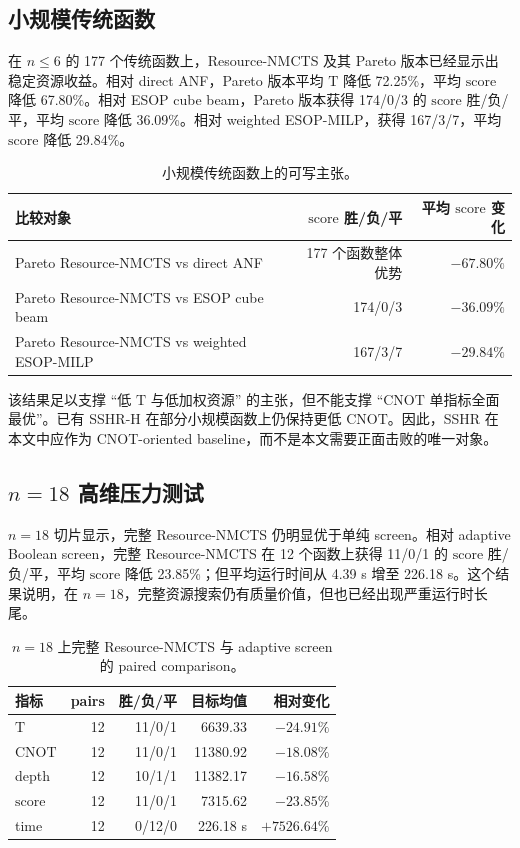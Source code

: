 \documentclass[UTF8,fontset=macnew,11pt]{ctexart}
\newcommand{\method}{Resource-NMCTS}
\newcommand{\score}{\ensuremath{\mathrm{score}}}
\newcommand{\cnot}{\ensuremath{\mathrm{CNOT}}}
\newcommand{\tcount}{\ensuremath{\mathrm{T}}}
\begin{document}
\subsection{小规模传统函数}

在 $n\leq6$ 的 177 个传统函数上，\method{} 及其 Pareto 版本已经显示出稳定资源收益。相对 direct ANF，Pareto 版本平均 \tcount{} 降低 72.25\%，平均 \score{} 降低 67.80\%。相对 ESOP cube beam，Pareto 版本获得 174/0/3 的 \score{} 胜/负/平，平均 \score{} 降低 36.09\%。相对 weighted ESOP-MILP，获得 167/3/7，平均 \score{} 降低 29.84\%。

\begin{table}[t]
\centering
\small
\caption{小规模传统函数上的可写主张。}
\label{tab:small_claims}
\begin{tabularx}{\linewidth}{>{\raggedright\arraybackslash}Xrr}
\toprule
比较对象 & \score{} 胜/负/平 & 平均 \score{} 变化 \\
\midrule
Pareto \method{} vs direct ANF & 177 个函数整体优势 & $-67.80\%$ \\
Pareto \method{} vs ESOP cube beam & 174/0/3 & $-36.09\%$ \\
Pareto \method{} vs weighted ESOP-MILP & 167/3/7 & $-29.84\%$ \\
\bottomrule
\end{tabularx}
\end{table}

该结果足以支撑 ``低 \tcount{} 与低加权资源'' 的主张，但不能支撑 ``\cnot{} 单指标全面最优''。已有 SSHR-H 在部分小规模函数上仍保持更低 \cnot{}。因此，SSHR 在本文中应作为 CNOT-oriented baseline，而不是本文需要正面击败的唯一对象。

\subsection{\texorpdfstring{$n=18$}{n=18} 高维压力测试}

$n=18$ 切片显示，完整 \method{} 仍明显优于单纯 screen。相对 adaptive Boolean screen，完整 \method{} 在 12 个函数上获得 11/0/1 的 \score{} 胜/负/平，平均 \score{} 降低 23.85\%；但平均运行时间从 4.39 s 增至 226.18 s。这个结果说明，在 $n=18$，完整资源搜索仍有质量价值，但也已经出现严重运行时长尾。

\begin{table}[t]
\centering
\small
\caption{$n=18$ 上完整 \method{} 与 adaptive screen 的 paired comparison。}
\label{tab:n18_resource_screen}
\begin{tabularx}{\linewidth}{>{\raggedright\arraybackslash}Xrrrr}
\toprule
指标 & pairs & 胜/负/平 & 目标均值 & 相对变化 \\
\midrule
\tcount{} & 12 & 11/0/1 & 6639.33 & $-24.91\%$ \\
\cnot{} & 12 & 11/0/1 & 11380.92 & $-18.08\%$ \\
depth & 12 & 10/1/1 & 11382.17 & $-16.58\%$ \\
\score{} & 12 & 11/0/1 & 7315.62 & $-23.85\%$ \\
time & 12 & 0/12/0 & 226.18 s & $+7526.64\%$ \\
\bottomrule
\end{tabularx}
\end{table}
\end{document}
